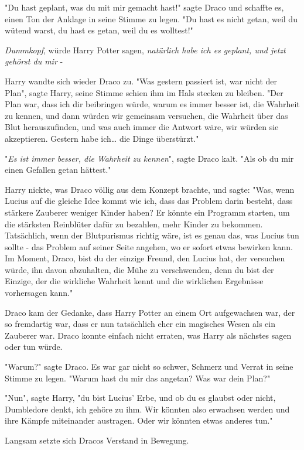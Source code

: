 {"Du hast geplant, was du mit mir gemacht hast!" sagte Draco und schaffte es, einen Ton der Anklage in seine Stimme zu legen. "Du hast es nicht getan, weil du wütend warst, du hast es getan, weil du es wolltest!"

\emph{Dummkopf}, würde Harry Potter sagen, \emph{natürlich habe ich es geplant, und jetzt gehörst du mir} -

Harry wandte sich wieder Draco zu. "Was gestern passiert ist, war nicht der Plan", sagte Harry, seine Stimme schien ihm im Hals stecken zu bleiben. "Der Plan war, dass ich dir beibringen würde, warum es immer besser ist, die Wahrheit zu kennen, und dann würden wir gemeinsam versuchen, die Wahrheit über das Blut herauszufinden, und was auch immer die Antwort wäre, wir würden sie akzeptieren. Gestern habe ich… die Dinge überstürzt."

"\emph{Es ist immer besser, die Wahrheit zu kennen}", sagte Draco kalt. "Als ob du mir einen Gefallen getan hättest."

Harry nickte, was Draco völlig aus dem Konzept brachte, und sagte: "Was, wenn Lucius auf die gleiche Idee kommt wie ich, dass das Problem darin besteht, dass stärkere Zauberer weniger Kinder haben? Er könnte ein Programm starten, um die stärksten Reinblüter dafür zu bezahlen, mehr Kinder zu bekommen. Tatsächlich, wenn der Blutpurismus richtig wäre, ist es genau das, was Lucius tun sollte - das Problem auf seiner Seite angehen, wo er sofort etwas bewirken kann. Im Moment, Draco, bist du der einzige Freund, den Lucius hat, der versuchen würde, ihn davon abzuhalten, die Mühe zu verschwenden, denn du bist der Einzige, der die wirkliche Wahrheit kennt und die wirklichen Ergebnisse vorhersagen kann."

Draco kam der Gedanke, dass Harry Potter an einem Ort aufgewachsen war, der so fremdartig war, dass er nun tatsächlich eher ein magisches Wesen als ein Zauberer war. Draco konnte einfach nicht erraten, was Harry als nächstes sagen oder tun würde.

"Warum?" sagte Draco. Es war gar nicht so schwer, Schmerz und Verrat in seine Stimme zu legen. "Warum hast du mir das angetan? Was war dein Plan?"

"Nun", sagte Harry, "du bist Lucius' Erbe, und ob du es glaubst oder nicht, Dumbledore denkt, ich gehöre zu ihm. Wir könnten also erwachsen werden und ihre Kämpfe miteinander austragen. Oder wir könnten etwas anderes tun."

Langsam setzte sich Dracos Verstand in Bewegung.

}
